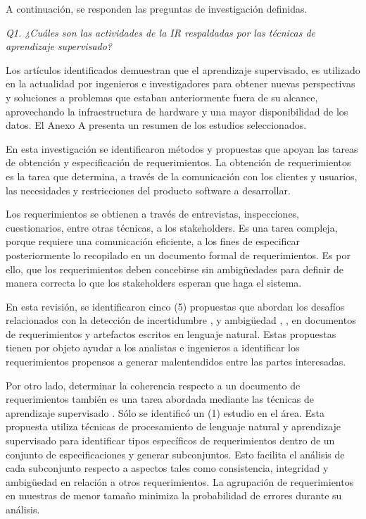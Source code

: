 \documentclass[journal]{IEEEtran}
\begin{document}
A continuación, se responden las preguntas de investigación definidas.

\emph{Q1. ¿Cuáles son las actividades de la IR respaldadas por las técnicas de aprendizaje supervisado?}

Los artículos identificados demuestran que el aprendizaje supervisado, es utilizado en la actualidad por ingenieros e investigadores para obtener nuevas perspectivas y soluciones a problemas que estaban anteriormente fuera de su alcance, aprovechando la infraestructura de hardware y una mayor disponibilidad de los datos. El Anexo A presenta un resumen de los estudios seleccionados.

En esta investigación se identificaron métodos y propuestas que apoyan las tareas de obtención y especificación de requerimientos. La obtención de requerimientos es la tarea que determina, a través de la comunicación con los clientes y usuarios, las necesidades y restricciones del producto software a desarrollar.
 
Los requerimientos se obtienen a través de entrevistas, inspecciones, cuestionarios, entre otras técnicas, a los stakeholders. Es una tarea compleja, porque requiere una comunicación eficiente, a los fines de especificar posteriormente lo recopilado en un documento formal de requerimientos. Es por ello, que los requerimientos deben concebirse sin ambigüedades para definir de manera correcta lo que los stakeholders esperan que haga el sistema.

En esta revisión, se identificaron cinco (5) propuestas que abordan los desafíos relacionados con la detección de incertidumbre \cite{yang2012speculative}, \cite{Knauss201685} y ambigüedad \cite{yang2010extending}, \cite{Yang2011}, \cite{Ott2013} en documentos de requerimientos y artefactos escritos en lenguaje natural. Estas propuestas tienen por objeto ayudar a los analistas e ingenieros a identificar los requerimientos propensos a generar malentendidos entre las partes interesadas.

Por otro lado, determinar la coherencia respecto a un documento de requerimientos también es una tarea abordada mediante las técnicas de aprendizaje supervisado \cite{nikora2009automated}. Sólo se identificó un (1) estudio en el área. Esta propuesta utiliza técnicas de procesamiento de lenguaje natural y aprendizaje supervisado para identificar tipos específicos de requerimientos dentro de un conjunto de especificaciones y generar subconjuntos. Esto facilita el análisis de cada subconjunto respecto a aspectos tales como consistencia, integridad y ambigüedad en relación a otros requerimientos. La agrupación de requerimientos en muestras de menor tamaño minimiza la probabilidad de errores durante su análisis.
\end{document}
